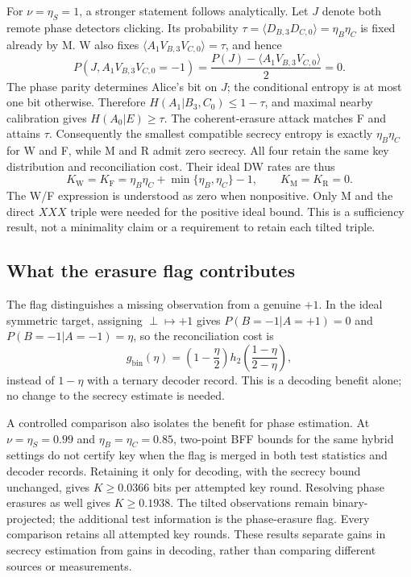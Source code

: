 \documentclass[aps,10pt,onecolumn,prx,superscriptaddress,longbibliography,nofootinbib]{revtex4-2}
\newcommand{\hbin}{h_2}
\newcommand{\perpout}{\perp}
\begin{document}
For \(\nu=\eta_S=1\), a stronger statement follows analytically. Let \(J\) denote both remote phase detectors clicking. Its probability \(\tau=\langle D_{B,3}D_{C,0}\rangle=\eta_B\eta_C\) is fixed already by M. W also fixes \(\langle A_1V_{B,3}V_{C,0}\rangle=\tau\), and hence
\begin{equation}
 P(J,A_1V_{B,3}V_{C,0}=-1)
 =\frac{P(J)-\langle A_1V_{B,3}V_{C,0}\rangle}{2}=0.
 \label{eq:si-ideal-phase-saturation}
\end{equation}
The phase parity determines Alice's bit on \(J\); the conditional entropy is at most one bit otherwise. Therefore \(H(A_1|B_3,C_0)\leq1-\tau\), and maximal nearby calibration gives \(H(A_0|E)\geq\tau\). The coherent-erasure attack matches F and attains \(\tau\). Consequently the smallest compatible secrecy entropy is exactly \(\eta_B\eta_C\) for W and F, while M and R admit zero secrecy. All four retain the same key distribution and reconciliation cost. Their ideal DW rates are thus
\begin{equation}
 K_{\mathrm W}=K_{\mathrm F}=\eta_B\eta_C+\min\{\eta_B,\eta_C\}-1,
 \qquad K_{\mathrm M}=K_{\mathrm R}=0.
 \label{eq:si-ideal-mwrf-rate}
\end{equation}
The W/F expression is understood as zero when nonpositive. Only M and the direct \(XXX\) triple were needed for the positive ideal bound. This is a sufficiency result, not a minimality claim or a requirement to retain each tilted triple.

\subsection{What the erasure flag contributes}\label{app:recording}

The flag distinguishes a missing observation from a genuine \(+1\). In the ideal symmetric target, assigning \(\perpout\mapsto+1\) gives \(P(B=-1|A=+1)=0\) and \(P(B=-1|A=-1)=\eta\), so the reconciliation cost is
\begin{equation}
 g_{\mathrm{bin}}(\eta)=\left(1-\frac\eta2\right)
 \hbin\!\left(\frac{1-\eta}{2-\eta}\right),
\end{equation}
instead of \(1-\eta\) with a ternary decoder record. This is a decoding benefit alone; no change to the secrecy estimate is needed.

A controlled comparison also isolates the benefit for phase estimation. At \(\nu=\eta_S=0.99\) and \(\eta_B=\eta_C=0.85\), two-point BFF bounds for the same hybrid settings do not certify key when the flag is merged in both test statistics and decoder records. Retaining it only for decoding, with the secrecy bound unchanged, gives \(K\geq0.0366\) bits per attempted key round. Resolving phase erasures as well gives \(K\geq0.1938\). The tilted observations remain binary-projected; the additional test information is the phase-erasure flag. Every comparison retains all attempted key rounds. These results separate gains in secrecy estimation from gains in decoding, rather than comparing different sources or measurements.
\end{document}
